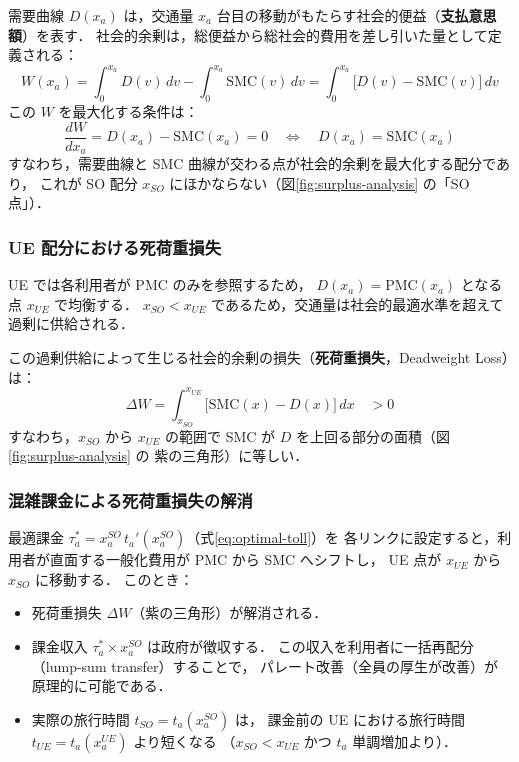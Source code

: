 需要曲線 $D(x_a)$ は，交通量 $x_a$ 台目の移動がもたらす社会的便益（\textbf{支払意思額}）を表す．
社会的余剰は，総便益から総社会的費用を差し引いた量として定義される：
\begin{equation}
  W(x_a)
  = \int_0^{x_a} D(v)\,dv
    - \int_0^{x_a} \text{SMC}(v)\,dv
  = \int_0^{x_a} \bigl[D(v) - \text{SMC}(v)\bigr]\,dv
  \label{eq:social-welfare}
\end{equation}
この $W$ を最大化する条件は：
\begin{equation}
  \frac{d W}{d x_a} = D(x_a) - \text{SMC}(x_a) = 0
  \quad \Longleftrightarrow \quad
  D(x_a) = \text{SMC}(x_a)
  \label{eq:so-condition}
\end{equation}
すなわち，需要曲線と SMC 曲線が交わる点が社会的余剰を最大化する配分であり，
これが SO 配分 $x_{SO}$ にほかならない（図\ref{fig:surplus-analysis} の「SO 点」）．

\subsubsection*{UE 配分における死荷重損失}

UE では各利用者が PMC のみを参照するため，
$D(x_a) = \text{PMC}(x_a)$ となる点 $x_{UE}$ で均衡する．
$x_{SO} < x_{UE}$ であるため，交通量は社会的最適水準を超えて過剰に供給される．

この過剰供給によって生じる社会的余剰の損失（\textbf{死荷重損失}，Deadweight Loss）は：
\begin{equation}
  \Delta W
  = \int_{x_{SO}}^{x_{UE}} \bigl[\text{SMC}(x) - D(x)\bigr]\,dx
  \quad > 0
  \label{eq:dwl}
\end{equation}
すなわち，$x_{SO}$ から $x_{UE}$ の範囲で SMC が $D$ を上回る部分の面積（図\ref{fig:surplus-analysis} の
紫の三角形）に等しい．

\subsubsection*{混雑課金による死荷重損失の解消}

最適課金 $\tau_a^* = x_a^{SO}\, t_a'(x_a^{SO})$（式\eqref{eq:optimal-toll}）を
各リンクに設定すると，利用者が直面する一般化費用が PMC から SMC へシフトし，
UE 点が $x_{UE}$ から $x_{SO}$ に移動する．
このとき：

\begin{itemize}
  \item 死荷重損失 $\Delta W$（紫の三角形）が解消される．
  \item 課金収入 $\tau_a^* \times x_a^{SO}$ は政府が徴収する．
        この収入を利用者に一括再配分（lump-sum transfer）することで，
        パレート改善（全員の厚生が改善）が原理的に可能である．
  \item 実際の旅行時間 $t_{SO} = t_a(x_a^{SO})$ は，
        課金前の UE における旅行時間 $t_{UE} = t_a(x_a^{UE})$ より短くなる
        （$x_{SO} < x_{UE}$ かつ $t_a$ 単調増加より）．
\end{itemize}

